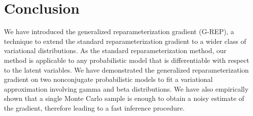 \vspace*{-9pt}
\section{Conclusion}
\vspace*{-9pt}

We have introduced the generalized reparameterization gradient (\acrshort{G-REP}), a technique to extend the standard reparameterization gradient to a wider class of variational distributions. As the standard reparameterization method, our method is applicable to any probabilistic model that is differentiable with respect to the latent variables. We have demonstrated the generalized reparameterization gradient on two nonconjugate probabilistic models to fit a variational approximation involving gamma and beta distributions. We have also empirically shown that a single Monte Carlo sample is enough to obtain a noisy estimate of the gradient, therefore leading to a fast inference procedure.
